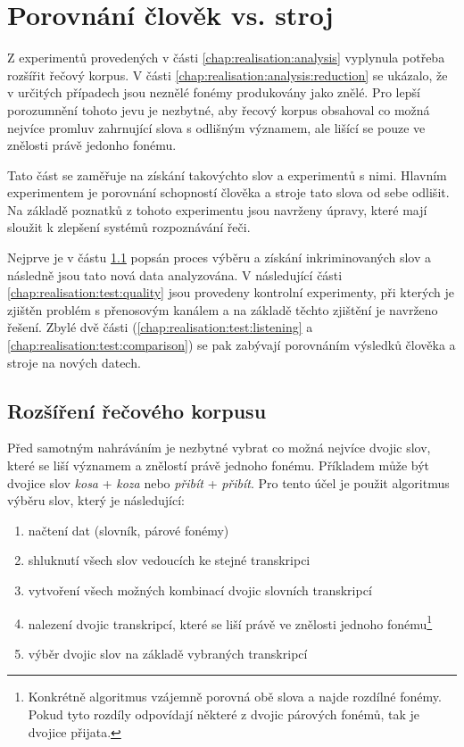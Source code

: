 \section{Porovnání člověk vs. stroj}
\label{chap:realisation:test}

Z experimentů provedených v části \ref{chap:realisation:analysis} vyplynula potřeba rozšířit řečový korpus. V části \ref{chap:realisation:analysis:reduction} se ukázalo, že v určitých případech jsou neznělé fonémy produkovány jako znělé. Pro lepší porozumnění tohoto jevu je nezbytné, aby řecový korpus obsahoval co možná nejvíce promluv zahrnující slova s odlišným významem, ale lišící se pouze ve znělosti právě jedonho fonému.

Tato část se zaměřuje na získání takovýchto slov a experimentů s nimi. Hlavním experimentem je porovnání schopností člověka a stroje tato slova od sebe odlišit. Na základě poznatků z tohoto experimentu jsou navrženy úpravy, které mají sloužit k zlepšení systémů rozpoznávání řeči.

Nejprve je v částu \ref{chap:realisation:test:corpus} popsán proces výběru a získání inkriminovaných slov a následně jsou tato nová data analyzována. V následující části \ref{chap:realisation:test:quality} jsou provedeny kontrolní experimenty, při kterých je zjištěn problém s přenosovým kanálem a na základě těchto zjištění je navrženo řešení. Zbylé dvě části (\ref{chap:realisation:test:listening} a \ref{chap:realisation:test:comparison}) se pak zabývají porovnáním výsledků člověka a stroje na nových datech.

\subsection{Rozšíření řečového korpusu}
\label{chap:realisation:test:corpus}

Před samotným nahráváním je nezbytné vybrat co možná nejvíce dvojic slov, které se liší významem a znělostí právě jednoho fonému. Příkladem může být dvojice slov \textit{kosa} + \textit{koza} nebo \textit{přibít} + \textit{přibít}. Pro tento účel je použit algoritmus výběru slov, který je následující:

\begin{enumerate}
  \item načtení dat (slovník, párové fonémy)
  \item shluknutí všech slov vedoucích ke stejné transkripci
  \item vytvoření všech možných kombinací dvojic slovních transkripcí
  \item nalezení dvojic transkripcí, které se liší právě ve znělosti jednoho fonému\footnote{Konkrétně algoritmus vzájemně porovná obě slova a najde rozdílné fonémy. Pokud tyto rozdíly odpovídají některé z dvojic párových fonémů, tak je dvojice přijata.}
  \item výběr dvojic slov na základě vybraných transkripcí
\end{enumerate}

